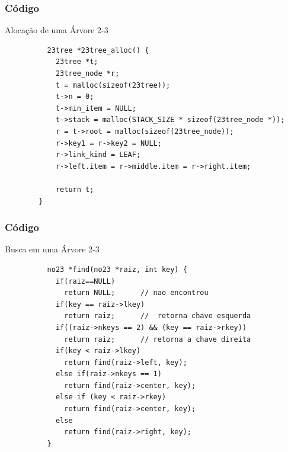 \documentclass[cyan,compress,aspectratio=43]{beamer}
\begin{document}
\begin{frame}[fragile]
\frametitle{Código}
      \vspace{-0.3cm}
	\begin{block}{Alocação de uma Árvore 2-3}
		\begin{lstlisting}
		  23tree *23tree_alloc() {
		    23tree *t;
		    23tree_node *r;
		    t = malloc(sizeof(23tree));
		    t->n = 0;
		    t->min_item = NULL;
		    t->stack = malloc(STACK_SIZE * sizeof(23tree_node *));
		    r = t->root = malloc(sizeof(23tree_node));
		    r->key1 = r->key2 = NULL;
		    r->link_kind = LEAF;
		    r->left.item = r->middle.item = r->right.item;

		    return t;
		}
		\end{lstlisting}

  	\end{block}      
\end{frame}
\begin{frame}[fragile]
\frametitle{Código}
      \vspace{-0.3cm}
	\begin{block}{Busca em uma Árvore 2-3}
		\begin{lstlisting}
		  no23 *find(no23 *raiz, int key) {
		    if(raiz==NULL)
		      return NULL;      // nao encontrou
		    if(key == raiz->lkey)
		      return raiz;      //  retorna chave esquerda
		    if((raiz->nkeys == 2) && (key == raiz->rkey))
		      return raiz;      // retorna a chave direita
		    if(key < raiz->lkey)
		      return find(raiz->left, key);
		    else if(raiz->nkeys == 1)
		      return find(raiz->center, key);
		    else if (key < raiz->rkey)
		      return find(raiz->center, key);
		    else
		      return find(raiz->right, key);
		  }
		\end{lstlisting}

  	\end{block}      
\end{frame}
\end{document}
